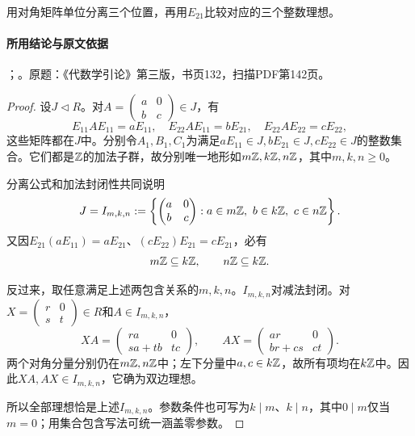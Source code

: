 用对角矩阵单位分离三个位置，再用$E_{21}$比较对应的三个整数理想。

\paragraph{所用结论与原文依据}

；。原题：《代数学引论》第三版，书页132，扫描PDF第142页。


\begin{proof}

设$J\lhd R$。对$A=\left(\begin{smallmatrix}a&0\\b&c\end{smallmatrix}\right)\in J$，有
\[
E_{11}AE_{11}=aE_{11},\quad E_{22}AE_{11}=bE_{21},\quad E_{22}AE_{22}=cE_{22},
\]
这些矩阵都在$J$中。分别令$A_1,B_1,C_1$为满足$aE_{11}\in J,bE_{21}\in J,cE_{22}\in J$的整数集合。它们都是$\mathbb Z$的加法子群，故分别唯一地形如$m\mathbb Z,k\mathbb Z,n\mathbb Z$，其中$m,k,n\ge0$。

分离公式和加法封闭性共同说明
\[
J=I_{m,k,n}:=\left\{\begin{pmatrix}a&0\\b&c\end{pmatrix}:a\in m\mathbb Z,\ b\in k\mathbb Z,\ c\in n\mathbb Z\right\}.
\]
又因$E_{21}(aE_{11})=aE_{21}$、$(cE_{22})E_{21}=cE_{21}$，必有
\[
m\mathbb Z\subseteq k\mathbb Z,\qquad n\mathbb Z\subseteq k\mathbb Z.
\]

反过来，取任意满足上述两包含关系的$m,k,n$。$I_{m,k,n}$对减法封闭。对$X=\left(\begin{smallmatrix}r&0\\s&t\end{smallmatrix}\right)\in R$和$A\in I_{m,k,n}$，
\[
XA=\begin{pmatrix}ra&0\\sa+tb&tc\end{pmatrix},\qquad
AX=\begin{pmatrix}ar&0\\br+cs&ct\end{pmatrix}.
\]
两个对角分量分别仍在$m\mathbb Z,n\mathbb Z$中；左下分量中$a,c\in k\mathbb Z$，故所有项均在$k\mathbb Z$中。因此$XA,AX\in I_{m,k,n}$，它确为双边理想。

所以全部理想恰是上述$I_{m,k,n}$。参数条件也可写为$k\mid m$、$k\mid n$，其中$0\mid m$仅当$m=0$；用集合包含写法可统一涵盖零参数。

\end{proof}

